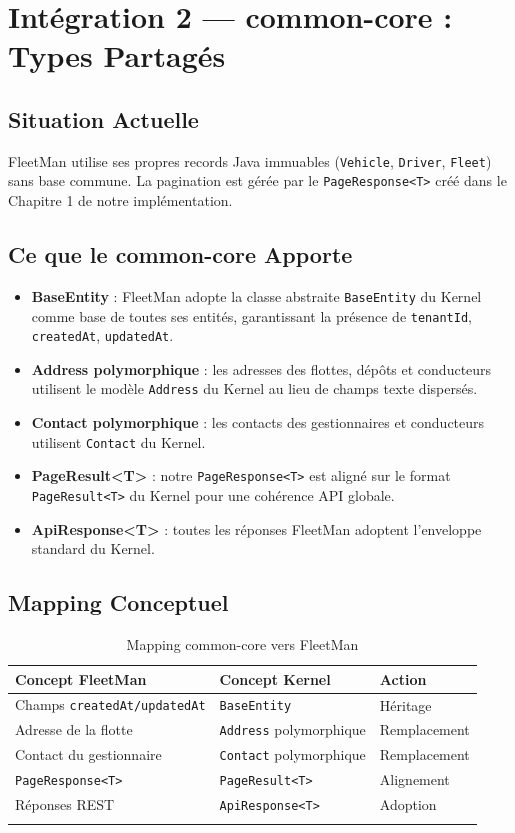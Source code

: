 \documentclass[12pt,a4paper]{report}
\begin{document}
\section{Intégration 2 — common-core : Types Partagés}

\subsection{Situation Actuelle}

FleetMan utilise ses propres records Java immuables (\texttt{Vehicle}, \texttt{Driver}, \texttt{Fleet}) sans base commune. La pagination est gérée par le \texttt{PageResponse<T>} créé dans le Chapitre 1 de notre implémentation.

\subsection{Ce que le common-core Apporte}

\begin{itemize}[leftmargin=2cm]
  \item \textbf{BaseEntity} : FleetMan adopte la classe abstraite \texttt{BaseEntity} du Kernel comme base de toutes ses entités, garantissant la présence de \texttt{tenantId}, \texttt{createdAt}, \texttt{updatedAt}.
  \item \textbf{Address polymorphique} : les adresses des flottes, dépôts et conducteurs utilisent le modèle \texttt{Address} du Kernel au lieu de champs texte dispersés.
  \item \textbf{Contact polymorphique} : les contacts des gestionnaires et conducteurs utilisent \texttt{Contact} du Kernel.
  \item \textbf{PageResult<T>} : notre \texttt{PageResponse<T>} est aligné sur le format \texttt{PageResult<T>} du Kernel pour une cohérence API globale.
  \item \textbf{ApiResponse<T>} : toutes les réponses FleetMan adoptent l'enveloppe standard du Kernel.
\end{itemize}

\subsection{Mapping Conceptuel}

\begin{longtable}{p{5cm}p{5cm}p{3cm}}
\toprule
\textbf{Concept FleetMan} & \textbf{Concept Kernel} & \textbf{Action} \\
\midrule
\endhead
Champs \texttt{createdAt/updatedAt} & \texttt{BaseEntity} & Héritage \\
Adresse de la flotte & \texttt{Address} polymorphique & Remplacement \\
Contact du gestionnaire & \texttt{Contact} polymorphique & Remplacement \\
\texttt{PageResponse<T>} & \texttt{PageResult<T>} & Alignement \\
Réponses REST & \texttt{ApiResponse<T>} & Adoption \\
\bottomrule
\caption{Mapping common-core vers FleetMan}
\end{longtable}
\end{document}
